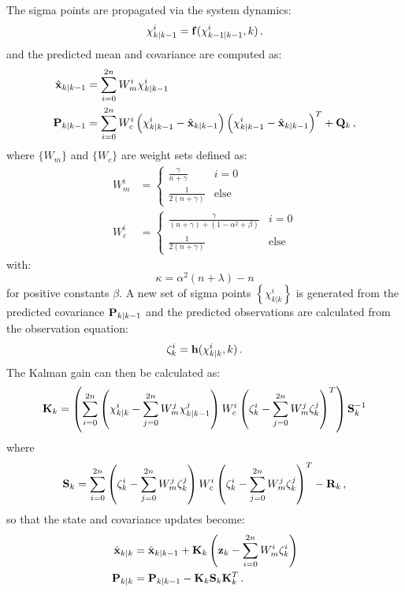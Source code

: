 The sigma points are propagated via the system dynamics:
\begin{equation}
\chi_{k|k-1}^i = \mathbf f(\chi_{k-1|k-1}^i,k) \,,
\end{equation}
and the predicted mean and covariance are computed as:
\begin{align}
\hat{\mathbf x}_{k|k-1} &= \sum_{i=0}^{2n} W_m^i \chi_{k|k-1}^i \\
\mathbf P_{k|k-1} &= \sum_{i=0}^{2n} W_c^i \left(\chi_{k|k-1}^i - \hat{\mathbf x}_{k|k-1}\right) \left(\chi_{k|k-1}^i - \hat{\mathbf x}_{k|k-1}\right)^T  + \mathbf Q_k\,,
\end{align}
where $\{W_m\}$ and $\{W_c\}$ are weight sets defined as:
\begin{align}
W_m^i &= \begin{cases} \frac{\gamma}{n+\gamma} & i = 0\\ \frac{1}{2(n+\gamma)} & \textrm{else}\end{cases} \\
W_c^i &= \begin{cases} \frac{\gamma}{(n+\gamma) + (1 - \alpha^2 + \beta)} & i = 0\\  \frac{1}{2(n+\gamma)} & \textrm{else} \end{cases}
\end{align}
with:
\begin{equation}
\kappa = \alpha^2(n  + \lambda) - n
\end{equation}
for positive constants $\beta$.
A new set of sigma points $\left\{\chi_{k|k}^i\right\}$ is generated from the predicted covariance $\mathbf P_{k|k-1}$ and the predicted observations are calculated from the observation equation:
\begin{equation}
\zeta_k^i = \mathbf h(\chi_{k|k}^i,k) \,.
\end{equation}
The Kalman gain can then be calculated as:
\begin{equation}
\mathbf K_k = \left(\sum_{i=0}^{2n} \left(\chi_{k|k}^i - \sum_{j=0}^{2n} W_m^j \chi_{k|k-1}^j \right) W_c^i\left(\zeta_k^i -  \sum_{j=0}^{2n} W_m^j \zeta_{k}^j \right)^T \right)\mathbf S_k^{-1}
\end{equation}
where
\begin{equation}
\mathbf S_k = \sum_{i=0}^{2n} \left(\zeta_k^i -  \sum_{j=0}^{2n} W_m^j \zeta_{k}^j \right) W_c^i\left(\zeta_k^i -  \sum_{j=0}^{2n} W_m^j \zeta_{k}^j \right)^T  - \mathbf R_k \,,
\end{equation}
so that the state and covariance updates become:
\begin{align}
\hat{\mathbf x}_{k|k} &= \hat{\mathbf x}_{k|k-1} + \mathbf K_k\left(\mathbf z_k -  \sum_{i=0}^{2n} W_m^i \zeta_k^i\right) \\
\mathbf P_{k|k} &= \mathbf P_{k|k-1} - \mathbf K_k\mathbf S_k\mathbf K_k^T\,.
\end{align}

